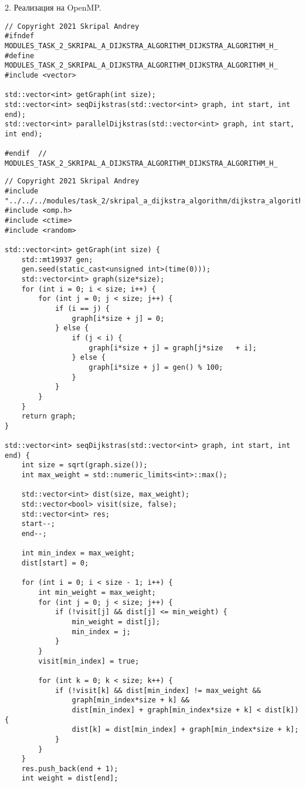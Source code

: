 \documentclass{report}
\begin{document}
\par 2. Реализация на OpenMP.
\begin{lstlisting}
// Copyright 2021 Skripal Andrey
#ifndef MODULES_TASK_2_SKRIPAL_A_DIJKSTRA_ALGORITHM_DIJKSTRA_ALGORITHM_H_
#define MODULES_TASK_2_SKRIPAL_A_DIJKSTRA_ALGORITHM_DIJKSTRA_ALGORITHM_H_
#include <vector>

std::vector<int> getGraph(int size);
std::vector<int> seqDijkstras(std::vector<int> graph, int start, int end);
std::vector<int> parallelDijkstras(std::vector<int> graph, int start, int end);

#endif  // MODULES_TASK_2_SKRIPAL_A_DIJKSTRA_ALGORITHM_DIJKSTRA_ALGORITHM_H_

\end{lstlisting}
\begin{lstlisting}
// Copyright 2021 Skripal Andrey
#include "../../../modules/task_2/skripal_a_dijkstra_algorithm/dijkstra_algorithm.h"
#include <omp.h>
#include <ctime>
#include <random>

std::vector<int> getGraph(int size) {
    std::mt19937 gen;
    gen.seed(static_cast<unsigned int>(time(0)));
    std::vector<int> graph(size*size);
    for (int i = 0; i < size; i++) {
        for (int j = 0; j < size; j++) {
            if (i == j) {
                graph[i*size + j] = 0;
            } else {
                if (j < i) {
                    graph[i*size + j] = graph[j*size   + i];
                } else {
                    graph[i*size + j] = gen() % 100;
                }
            }
        }
    }
    return graph;
}

std::vector<int> seqDijkstras(std::vector<int> graph, int start, int end) {
    int size = sqrt(graph.size());
    int max_weight = std::numeric_limits<int>::max();

    std::vector<int> dist(size, max_weight);
    std::vector<bool> visit(size, false);
    std::vector<int> res;
    start--;
    end--;

    int min_index = max_weight;
    dist[start] = 0;

    for (int i = 0; i < size - 1; i++) {
        int min_weight = max_weight;
        for (int j = 0; j < size; j++) {
            if (!visit[j] && dist[j] <= min_weight) {
                min_weight = dist[j];
                min_index = j;
            }
        }
        visit[min_index] = true;

        for (int k = 0; k < size; k++) {
            if (!visit[k] && dist[min_index] != max_weight &&
                graph[min_index*size + k] &&
                dist[min_index] + graph[min_index*size + k] < dist[k]) {
                dist[k] = dist[min_index] + graph[min_index*size + k];
            }
        }
    }
    res.push_back(end + 1);
    int weight = dist[end];


\end{lstlisting}
\end{document}
